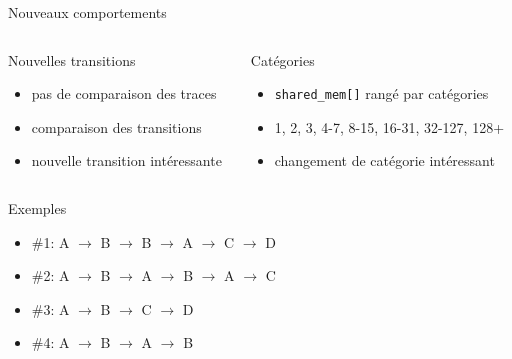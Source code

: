 \begin{frame}{Nouveaux comportements}
  \begin{columns}
    \begin{column}{0.5\textwidth}
      \begin{exampleblock}{Nouvelles transitions}
        \begin{itemize}
          \item{pas de comparaison des traces}
          \item{comparaison des transitions}
          \item{nouvelle transition intéressante}
        \end{itemize}
        \vspace{1.25ex}
      \end{exampleblock}
    \end{column}

    \begin{column}{0.5\textwidth}
      \begin{exampleblock}{Catégories}
        \begin{itemize}
          \item{\lstinline{shared_mem[]} rangé par catégories}
          \item{1, 2, 3, 4-7, 8-15, 16-31, 32-127, 128+}
          \item{changement de catégorie intéressant}
        \end{itemize}
      \end{exampleblock}
    \end{column}
  \end{columns}

  \pause
  \hspace{50.5cm}

  {\Large \centerline{Exemples}}

  \hspace{20.5cm}

  \begin{itemize}
    \item{\#1: A $\rightarrow$ B $\rightarrow$ B $\rightarrow$ A $\rightarrow$ C $\rightarrow$ D} \pause
    \item{\#2: A $\rightarrow$ B $\rightarrow$ A $\rightarrow$ B $\rightarrow$ A $\rightarrow$ C} \pause
    \item{\#3: A $\rightarrow$ B $\rightarrow$ C $\rightarrow$ D} \pause
    \item{\#4: A $\rightarrow$ B $\rightarrow$ A $\rightarrow$ B}
  \end{itemize}
\end{frame}

